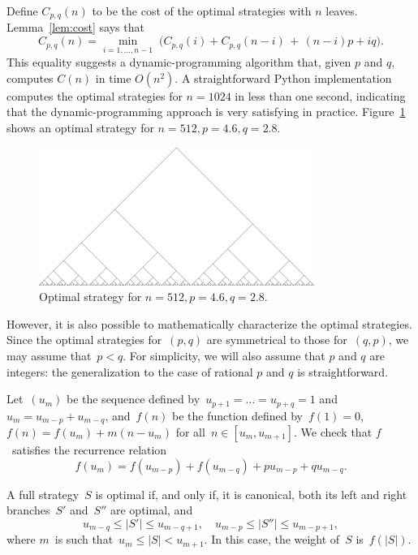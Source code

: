 \documentclass[jmc]{degruyter-journal-a}
\theoremstyle{definition}
\def\abs#1{\left|#1\right|}
\begin{document}
Define $C_{p,q}(n)$ to be the cost of the optimal strategies with $n$
leaves. Lemma~\ref{lem:cost} says that
\begin{equation}
  C_{p,q}(n) = \min_{i = 1, \dots, n-1} \;
    \bigl(C_{p,q}(i) + C_{p,q}(n-i) \,+ \,(n-i)p + iq\bigr).
\end{equation}
This equality suggests a dynamic-programming algorithm that, given $p$
and $q$, computes $C(n)$ in time $O(n^2)$. A straightforward Python
implementation computes the optimal strategies for $n=1024$ in less
than one second, indicating that the dynamic-programming approach is
very satisfying in practice. Figure~\ref{fig:optimal} shows an
optimal strategy for $n=512,p=4.6,q=2.8$.

\begin{figure}[t]
  \centering
  \includegraphics[width=0.8\textwidth]{optimal.png}
  \caption{Optimal strategy for $n=512,p=4.6,q=2.8$.}
  \label{fig:optimal}
\end{figure}

However, it is also possible to mathematically characterize the
optimal strategies. Since the optimal strategies for~$(p,q)$ are
symmetrical to those for~$(q,p)$, we may assume that~$p < q$. For
simplicity, we will also assume that $p$ and $q$ are integers: the
generalization to the case of rational $p$ and $q$ is
straightforward.

Let~$(u_m)$ be the sequence defined by~$u_{p+1} =
\dots = u_{p+q} = 1$ and~$u_m = u_{m-p} + u_{m-q}$, and~$f(n)$ be the
function defined by~$f(1) = 0$, $f(n) = f(u_{m}) + m(n - u_m)$
for all~$n \in [u_{m}, u_{m+1}]$. We check that $f$~satisfies the
recurrence relation
\begin{equation}\label{eq:recurrence-f}
f(u_m) = f(u_{m-p}) + f(u_{m-q}) + p u_{m-p} + q u_{m-q}.
\end{equation}

\begin{proposition}\label{prop:optimal-strategy}
A full strategy~$S$ is optimal if, and only if, it is canonical, both its left
and right branches~$S'$ and~$S''$ are optimal, and
\[ u_{m-q} \leq \abs{S'} \leq u_{m-q+1}, \quad
  u_{m-p} \leq \abs{S''} \leq u_{m-p+1}, \]
where $m$~is such that~$u_{m} \leq \abs{S} < u_{m+1}$. In this case, the
weight of~$S$ is~$f(\abs{S})$.
\end{proposition}
\end{document}
